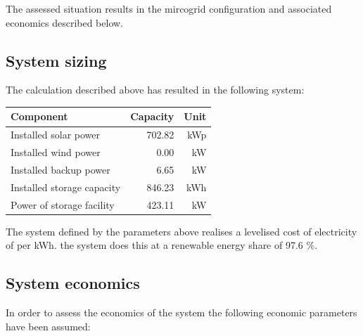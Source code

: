 \documentclass{article}[11pt]
\begin{document}
\begin{multicols}{2}
The assessed situation results in the mircogrid configuration and associated economics described below.

\subsection*{System sizing}

The calculation described above has resulted in the following system:

{\color{black}\begin{flushleft}

\begin{tabular}{|l|r|r|}

\hline Component&Capacity&Unit\\ \hline 

Installed solar power&702.82&kWp\\ 

Installed wind power&0.00&kW\\ 

Installed backup power&6.65&kW\\ 

Installed storage capacity&846.23&kWh\\ 

Power of storage facility&423.11&kW\\ 

\hline

\end{tabular}

\label{tab:systemlayout}

\end{flushleft}}\vspace{0.5mm}

The system defined by the parameters above realises a levelised cost of electricity of  per kWh. the system does this at a renewable energy share of 97.6 \%. 

\subsection*{System economics}

In order to assess the economics of the system the following economic parameters have been assumed: 

{\color{black}\begin{flushleft}

\begin{tabular}{|l|r|r|}


\end{tabular}
\end{flushleft}}
\end{multicols}
\end{document}
